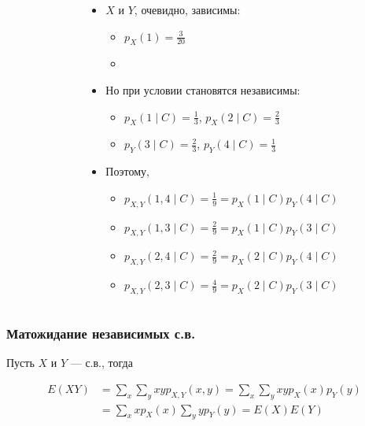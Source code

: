 \documentclass[hyperref=unicode,graphics=pdflatex,13pt,xcolor={usenames,dvipsnames}]{beamer}
\renewcommand\emph[1]{{\color{blue}{#1}}}
\newcommand\red[1]{{\color{red}{#1}}}
\newcommand\pitem{\pause\item}
\begin{document}
\begin{frame}
\begin{columns}
\begin{column}{0.3\textwidth}
\begin{center}
{\begin{tikzpicture}
          \end{tikzpicture}
        }
      \end{center}
    \end{column}
    \begin{column}{0.7\textwidth}
      \begin{itemize}
        \item $X$ и $Y$, очевидно, зависимы:
        \begin{itemize}
          \item $p_X(1) = \frac{3}{20}$
          \item \red{$p_{X \mid Y}(1, 1) = 0$}
        \end{itemize}
        \pitem Но при условии \emph{$C = (X \le 2 \cap Y \ge 3)$} становятся независимы:
        \begin{itemize}
          \setlength\itemsep{2pt}
          \item $p_X(1 \mid C) = \frac{1}{3}$, $p_X(2 \mid C) = \frac{2}{3}$
          \item $p_Y(3 \mid C) = \frac{2}{3}$, $p_Y(4 \mid C) = \frac{1}{3}$ 
        \end{itemize}
        \pitem Поэтому,
        \begin{itemize}
          \setlength\itemsep{2pt}
          \item $p_{X, Y} (1, 4 \mid C) = \frac{1}{9} = p_X(1 \mid C) p_Y(4 \mid C)$
          \item $p_{X, Y} (1, 3 \mid C) = \frac{2}{9} = p_X(1 \mid C) p_Y(3 \mid C)$
          \item $p_{X, Y} (2, 4 \mid C) = \frac{2}{9} = p_X(2 \mid C) p_Y(4 \mid C)$
          \item $p_{X, Y} (2, 3 \mid C) = \frac{4}{9} = p_X(2 \mid C) p_Y(3 \mid C)$
        \end{itemize}
      \end{itemize}
    \end{column}
  \end{columns}
  
  

\end{frame}

\begin{frame}
  \frametitle{Матожидание независимых с.в.}

  Пусть $X$ и $Y$ --- \emph{независимые} с.в., тогда 
  \begin{center}
  \end{center}

  \pause
  \begin{align*}
    E(XY) &= \sum_x \sum_y xy p_{X, Y}(x , y) = \sum_x \sum_y xy p_X(x) p_Y(y) \\
          &= \sum_x x p_X(x) \sum_y y p_Y(y) = E(X) E(Y)
  \end{align*}


\end{frame}
\end{document}
